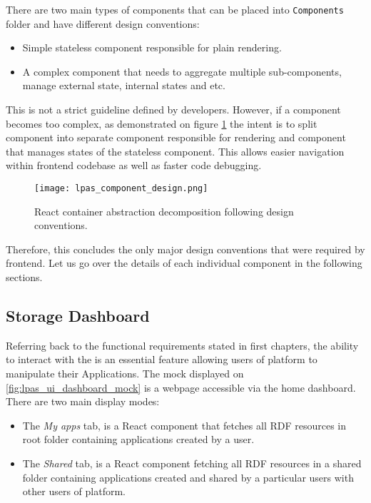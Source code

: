 There are two main types of components that can be placed into \texttt{Components} folder and have different design conventions:
\begin{itemize}
	\item Simple stateless component responsible for plain rendering.
	\item A complex component that needs to aggregate multiple sub-components, manage external state, internal states and etc.
\end{itemize}


This is not a strict guideline defined by \lpa{} developers. However, if a component becomes too complex, as demonstrated on figure \ref{fig:lpas_component_design} the intent is to split component into separate component responsible for rendering and component that manages states of the stateless component. This allows easier navigation within frontend codebase as well as faster code debugging. 

\begin{figure}[h]
\centering
\texttt{[image: lpas\_component\_design.png]}
\caption{React container abstraction decomposition following \lpas{} design conventions.}
\label{fig:lpas_component_design}
\end{figure}

Therefore, this concludes the only major design conventions that were required by \lpa{} frontend. Let us go over the details of each individual component in the following sections.

\subsection{Storage Dashboard}

Referring back to the functional requirements stated in first chapters, the ability to interact with the \lpas{} is an essential feature allowing users of \lpa{} platform to manipulate their Applications. The mock displayed on \ref{fig:lpas_ui_dashboard_mock} is a webpage accessible via the home dashboard. There are two main display modes:

\begin{itemize}
	\item The \textit{My apps} tab, is a React component that fetches all RDF resources in root \lpas{} folder containing applications created by a user. 
	\item The \textit{Shared} tab, is a React component fetching all RDF resources in a shared \lpas{} folder containing applications created and shared by a particular users with other users of \lpas{} platform.
\end{itemize}


